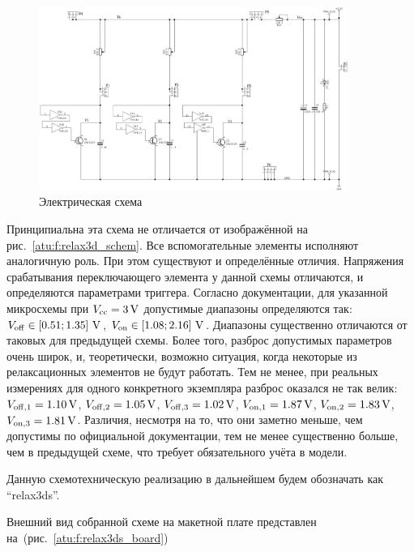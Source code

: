 \begin{figure}[htb!]
  \centerline{\includegraphics[width=0.9\textwidth]{p/relax3ds_schem.png} }
  \caption{Электрическая схема \RelaxShIi}
  \label{atu:f:relax3ds_schem}
\end{figure}

Принципиальна эта схема не отличается от изображённой на рис.~\ref{atu:f:relax3d_schem}.
Все вспомогательные элементы исполняют аналогичную роль.
При этом существуют и определённые отличия.
Напряжения срабатывания переключающего элемента
у данной схемы отличаются, и определяются
параметрами триггера.
Согласно документации, для указанной микросхемы
при $V_\mathrm{cc} = \SI{3}{\volt} $
допустимые диапазоны определяются так:
$V_\mathrm{off} \in [ 0.51; 1.35 ]~ \SI{}{\volt}$,
$V_\mathrm{on}  \in [ 1.08; 2.16 ]~ \SI{}{\volt}$.
Диапазоны существенно отличаются от таковых для предыдущей схемы.
Более того, разброс допустимых параметров очень широк,
и, теоретически, возможно ситуация, когда некоторые из релаксационных
элементов не будут работать.
Тем не менее, при реальных измерениях
для одного конкретного экземпляра
разброс оказался не так велик:
$V_\mathrm{off,1} = \SI{1.10}{\volt}$,
$V_\mathrm{off,2} = \SI{1.05}{\volt}$,
$V_\mathrm{off,3} = \SI{1.02}{\volt}$,
$V_\mathrm{on,1}  = \SI{1.87}{\volt}$,
$V_\mathrm{on,2}  = \SI{1.83}{\volt}$,
$V_\mathrm{on,3}  = \SI{1.81}{\volt}$.
Различия, несмотря на то, что они заметно меньше, чем допустимы по официальной документации,
тем не менее существенно больше, чем в предыдущей схеме, что требует
обязательного учёта в модели.

Данную схемотехническую реализацию в дальнейшем будем обозначать как ``relax3ds''.

Внешний вид собранной схеме на макетной плате представлен на~(рис.~\ref{atu:f:relax3ds_board})

